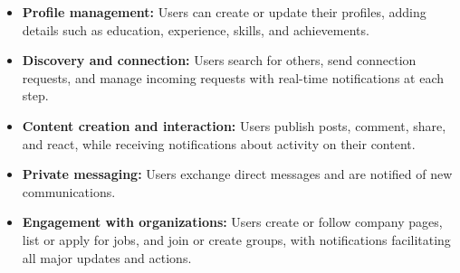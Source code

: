 \begin{itemize}
\item
\protect{}\label{c8U-YTViO-CQs2sYPf7DF}
\textbf{Profile management:} Users can create or update their profiles, adding details such as education, experience, skills, and achievements.
\item
\protect{}\label{W4A6DZWN6lCsBs4EiScwU}
\textbf{Discovery and connection:} Users search for others, send connection requests, and manage incoming requests with real-time notifications at each step.
\item
\protect{}\label{q7ug8CSGrYhNAB-nIpxJw}
\textbf{Content creation and interaction:} Users publish posts, comment, share, and react, while receiving notifications about activity on their content.
\item
\protect{}\label{DzEkUg3m7c6f5pFa7rEdc}
\textbf{Private messaging:} Users exchange direct messages and are notified of new communications.
\item
\protect{}\label{Y4M7bZqVThUzJodTQvv2j}
\textbf{Engagement with organizations:} Users create or follow company pages, list or apply for jobs, and join or create groups, with notifications facilitating all major updates and actions.
\end{itemize}

